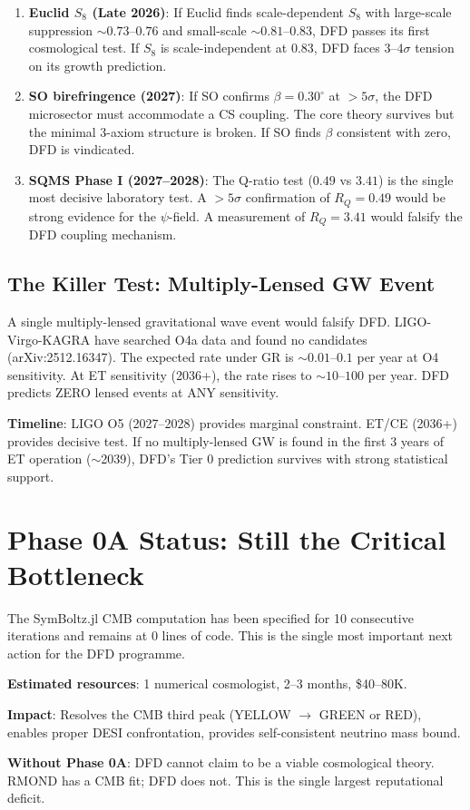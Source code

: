 \documentclass[11pt,a4paper]{article}
\begin{document}
\begin{enumerate}
\item \textbf{Euclid $S_8$ (Late 2026)}: If Euclid finds scale-dependent $S_8$ with large-scale suppression $\sim 0.73$--$0.76$ and small-scale $\sim 0.81$--$0.83$, DFD passes its first cosmological test. If $S_8$ is scale-independent at $0.83$, DFD faces $3$--$4\sigma$ tension on its growth prediction.

\item \textbf{SO birefringence (2027)}: If SO confirms $\beta = 0.30^\circ$ at $>5\sigma$, the DFD microsector must accommodate a CS coupling. The core theory survives but the minimal 3-axiom structure is broken. If SO finds $\beta$ consistent with zero, DFD is vindicated.

\item \textbf{SQMS Phase I (2027--2028)}: The Q-ratio test ($0.49$ vs $3.41$) is the single most decisive laboratory test. A $>5\sigma$ confirmation of $R_Q = 0.49$ would be strong evidence for the $\psi$-field. A measurement of $R_Q = 3.41$ would falsify the DFD coupling mechanism.
\end{enumerate}

\subsection{The Killer Test: Multiply-Lensed GW Event}

A single multiply-lensed gravitational wave event would falsify DFD. LIGO-Virgo-KAGRA have searched O4a data and found no candidates (arXiv:2512.16347). The expected rate under GR is $\sim 0.01$--$0.1$ per year at O4 sensitivity. At ET sensitivity (2036+), the rate rises to $\sim 10$--$100$ per year. DFD predicts ZERO lensed events at ANY sensitivity.

\textbf{Timeline}: LIGO O5 (2027--2028) provides marginal constraint. ET/CE (2036+) provides decisive test. If no multiply-lensed GW is found in the first 3 years of ET operation ($\sim$2039), DFD's Tier 0 prediction survives with strong statistical support.

\section{Phase 0A Status: Still the Critical Bottleneck}

\begin{tcolorbox}[colback=red!5!white, colframe=red!60!black, title={Phase 0A: STILL UNEXECUTED}]
The SymBoltz.jl CMB computation has been specified for 10 consecutive iterations and remains at 0 lines of code. This is the single most important next action for the DFD programme.

\textbf{Estimated resources}: 1 numerical cosmologist, 2--3 months, \$40--80K.

\textbf{Impact}: Resolves the CMB third peak (YELLOW $\to$ GREEN or RED), enables proper DESI confrontation, provides self-consistent neutrino mass bound.

\textbf{Without Phase 0A}: DFD cannot claim to be a viable cosmological theory. RMOND has a CMB fit; DFD does not. This is the single largest reputational deficit.
\end{tcolorbox}
\end{document}
